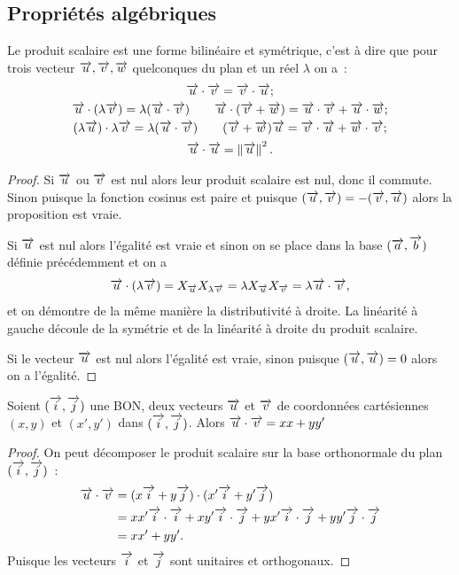 \subsection{Propriétés algébriques}
\begin{prop}
  Le produit scalaire est une forme bilinéaire et symétrique, c'est à dire que pour trois vecteur $\vu, \vv, \vw$ quelconques du plan et un réel $\lambda$ on a~:
  \begin{gather}
    \vu \cdot \vv = \vv \cdot \vu;\\
    \vu \cdot (\lambda \vv) = \lambda (\vu\cdot \vv) \qquad \vu \cdot (\vv + \vw)=\vu \cdot \vv + \vu \cdot \vw;\\
    (\lambda \vu) \cdot \lambda \vv = \lambda (\vu \cdot \vv) \qquad (\vv + \vw) \vu=\vv \cdot \vu + \vw \cdot \vv;\\
    \vu \cdot \vu = \norme{\vu}^2.
  \end{gather}
\end{prop}
\begin{proof}
  Si $\vu$ ou $\vv$ est nul alors leur produit scalaire est nul, donc il commute. Sinon puisque la fonction cosinus est paire et puisque $(\vu,\vv)=-(\vv,\vu)$ alors la proposition est vraie.

  Si $\vu$ est nul alors l'égalité est vraie et sinon on se place dans la base $(\vect{a},\vect{b})$ définie précédemment et on a 
  \begin{equation}
    \vu \cdot (\lambda \vv) = X_{\vu} X_{\lambda \vv}=\lambda X_{\vu} X_{\vv}=\lambda \vu \cdot \vv,
  \end{equation}
  et on démontre de la même manière la distributivité à droite. La linéarité à gauche découle de la symétrie et de la linéarité à droite du produit scalaire.
   
  Si le vecteur $\vu$ est nul alors l'égalité est vraie, sinon puisque $(\vu,\vu)=0$ alors on a l'égalité.  
\end{proof}
\begin{prop}
  Soient $(\vi,\vj)$ une BON, deux vecteurs $\vu$ et $\vv$ de coordonnées cartésiennes $(x,y)$ et $(x',y')$ dans $(\vi,\vj)$. Alors $\vu \cdot \vv=xx+yy'$
\end{prop}
\begin{proof}
  On peut décomposer le produit scalaire sur la base orthonormale du plan $(\vi,\vj)$~:
  \begin{align}
    \vu \cdot \vv &= (x \vi + y \vj) \cdot (x' \vi + y' \vj) \\
    &= x x' \vi \cdot \vi + xy' \vi \cdot \vj + yx' \vi \cdot \vj + yy' \vj \cdot \vj\\
    & = xx' +yy'.
  \end{align}
  Puisque les vecteurs $\vi$ et $\vj$ sont unitaires et orthogonaux.
\end{proof}
